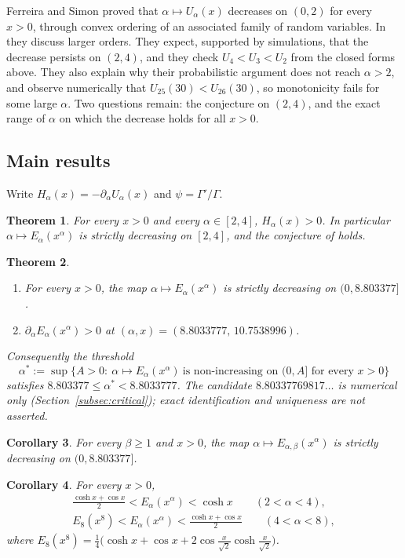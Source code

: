 \documentclass[11pt,a4paper]{article}
\theoremstyle{plain}
\newtheorem{theorem}{Theorem}[section]
\newtheorem{corollary}[theorem]{Corollary}
\theoremstyle{remark}
\begin{document}
Ferreira and Simon \cite[Theorem~A]{FS} proved that $\alpha\mapsto U_\alpha(x)$ decreases on
$(0,2)$ for every $x>0$, through convex ordering of an associated family of random variables.
In \cite[Remark~1(a)]{FS} they discuss larger orders. They expect, supported by simulations, that
the decrease persists on $(2,4)$, and they check $U_4<U_3<U_2$ from the closed forms above. They
also explain why their probabilistic argument does not reach $\alpha>2$, and observe numerically
that $U_{25}(30)<U_{26}(30)$, so monotonicity fails for some large $\alpha$. Two questions remain:
the conjecture on $(2,4)$, and the exact range of $\alpha$ on which the decrease holds for all $x>0$.

\subsection{Main results}
Write $H_\alpha(x)=-\partial_\alpha U_\alpha(x)$ and $\psi=\Gamma'/\Gamma$.

\begin{theorem}\label{thm:24}
For every $x>0$ and every $\alpha\in[2,4]$, $H_\alpha(x)>0$. In particular
$\alpha\mapsto E_\alpha(x^\alpha)$ is strictly decreasing on $[2,4]$, and the conjecture of
\cite[Remark~1(a)]{FS} holds.
\end{theorem}

\begin{theorem}\label{thm:sharp}
\begin{enumerate}
 \item[(i)] For every $x>0$, the map $\alpha\mapsto E_\alpha(x^\alpha)$ is strictly decreasing on
 $(0,8.803377]$.
 \item[(ii)] $\partial_\alpha E_\alpha(x^\alpha)>0$ at $(\alpha,x)=(8.8033777,\,10.7538996)$.
\end{enumerate}
Consequently the threshold
\[
 \alpha^*:=\sup\bigl\{A>0:\ \alpha\mapsto E_\alpha(x^\alpha)\ \text{is non-increasing on }(0,A]
 \text{ for every }x>0\bigr\}
\]
satisfies $8.803377\le\alpha^*<8.8033777$. The candidate $8.80337769817\ldots$ is numerical only
(Section~\ref{subsec:critical}); exact identification and uniqueness are not asserted.
\end{theorem}

\begin{corollary}\label{cor:beta}
For every $\beta\ge1$ and $x>0$, the map $\alpha\mapsto E_{\alpha,\beta}(x^\alpha)$ is strictly
decreasing on $(0,8.803377]$.
\end{corollary}

\begin{corollary}\label{cor:bounds}
For every $x>0$,
\begin{gather*}
 \frac{\cosh x+\cos x}{2}<E_\alpha(x^\alpha)<\cosh x\qquad(2<\alpha<4),\\
 E_8(x^8)<E_\alpha(x^\alpha)<\frac{\cosh x+\cos x}{2}\qquad(4<\alpha<8),
\end{gather*}
where
$E_8(x^8)=\tfrac14\bigl(\cosh x+\cos x+2\cos\tfrac{x}{\sqrt2}\cosh\tfrac{x}{\sqrt2}\bigr)$.
\end{corollary}
\end{document}

